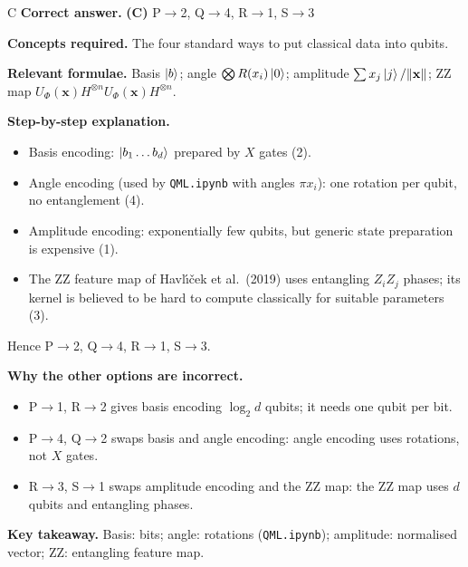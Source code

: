 \documentclass[11pt,a4paper]{article}
\newcommand{\qsep}{\par\vspace{2pt}{\color{black!15}\hrule}\vspace{4pt}}
\begin{document}
\begin{solbox}{C}
\textbf{\color{brand}Correct answer.} \textcolor{okgreen}{\textbf{(C)}} P$\to$2, Q$\to$4, R$\to$1, S$\to$3

\textbf{\color{brand}Concepts required.} The four standard ways to put classical data into qubits.

\textbf{\color{brand}Relevant formulae.} Basis $\ket{b}$; angle $\bigotimes R(x_i)\ket0$; amplitude $\sum x_j\ket j/\|\mathbf x\|$; ZZ map $U_\Phi(\mathbf x)H^{\otimes n}U_\Phi(\mathbf x)H^{\otimes n}$.

\textbf{\color{brand}Step-by-step explanation.} \begin{itemize}\itemsep0pt
\item Basis encoding: $\ket{b_1\dots b_d}$ prepared by $X$ gates (2).
\item Angle encoding (used by \texttt{QML.ipynb} with angles $\pi x_i$): one rotation per qubit, no entanglement (4).
\item Amplitude encoding: exponentially few qubits, but generic state preparation is expensive (1).
\item The ZZ feature map of Havl\'{\i}\v{c}ek et al.\ (2019) uses entangling $Z_iZ_j$ phases; its kernel is believed to be hard to
compute classically for suitable parameters (3).
\end{itemize}
Hence P$\to$2, Q$\to$4, R$\to$1, S$\to$3.

\textbf{\color{brand}Why the other options are incorrect.}
\begin{itemize}[leftmargin=2.4em, itemsep=1pt, topsep=2pt]
\item[\textbf{(A)}] P$\to$1, R$\to$2 gives basis encoding $\log_2d$ qubits; it needs one qubit per bit.
\item[\textbf{(B)}] P$\to$4, Q$\to$2 swaps basis and angle encoding: angle encoding uses rotations, not $X$ gates.
\item[\textbf{(D)}] R$\to$3, S$\to$1 swaps amplitude encoding and the ZZ map: the ZZ map uses $d$ qubits and entangling phases.
\end{itemize}
\textbf{\color{brand}Key takeaway.} Basis: bits; angle: rotations (\texttt{QML.ipynb}); amplitude: normalised vector; ZZ: entangling feature map.
\end{solbox}
\qsep
\end{document}
